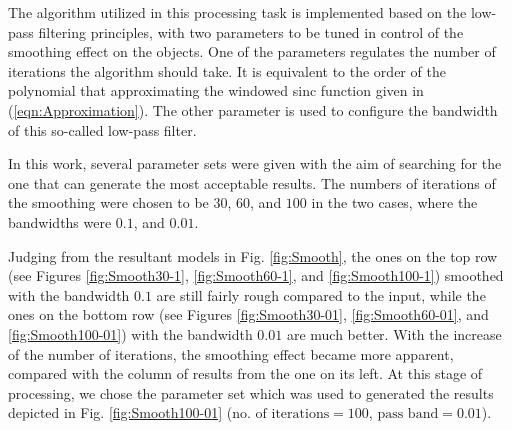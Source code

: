 The algorithm utilized in this processing task is implemented based on the low-pass filtering principles, with two parameters to be tuned in control of the smoothing effect on the objects. %
One of the parameters regulates the number of iterations the algorithm should take.
It is equivalent to the order of the polynomial that approximating the windowed sinc function given in (\ref{eqn:Approximation}).
The other parameter is used to configure the bandwidth of this so-called low-pass filter.

In this work, several parameter sets were given with the aim of searching for the one that can generate the most acceptable results.
The numbers of iterations of the smoothing were chosen to be $30$, $60$, and $100$ in the two cases, where the bandwidths were $0.1$, and $0.01$.

Judging from the resultant models in Fig. \ref{fig:Smooth}, the ones on the top row (see Figures \ref{fig:Smooth30-1}, \ref{fig:Smooth60-1}, and \ref{fig:Smooth100-1}) smoothed with the bandwidth $0.1$ are still fairly rough compared to the input, while the ones on the bottom row (see Figures \ref{fig:Smooth30-01}, \ref{fig:Smooth60-01}, and \ref{fig:Smooth100-01}) with the bandwidth $0.01$ are much better. %
With the increase of the number of iterations, the smoothing effect became more apparent, compared with the column of results from the one on its left.
At this stage of processing, we chose the parameter set which was used to generated the results depicted in Fig. \ref{fig:Smooth100-01} ($\text{no. of iterations} = 100$, $\text{pass band} = 0.01$). %
